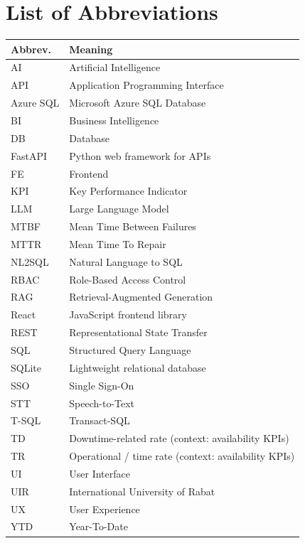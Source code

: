 \documentclass[12pt,a4paper,openany]{report}
\begin{document}
\chapter*{List of Abbreviations}
\begin{longtable}{@{}p{3.2cm}p{11cm}@{}}
\toprule
\textbf{Abbrev.} & \textbf{Meaning} \\
\midrule
\endhead
AI & Artificial Intelligence \\
API & Application Programming Interface \\
Azure SQL & Microsoft Azure SQL Database \\
BI & Business Intelligence \\
DB & Database \\
FastAPI & Python web framework for APIs \\
FE & Frontend \\
KPI & Key Performance Indicator \\
LLM & Large Language Model \\
MTBF & Mean Time Between Failures \\
MTTR & Mean Time To Repair \\
NL2SQL & Natural Language to SQL \\
RBAC & Role-Based Access Control \\
RAG & Retrieval-Augmented Generation \\
React & JavaScript frontend library \\
REST & Representational State Transfer \\
SQL & Structured Query Language \\
SQLite & Lightweight relational database \\
SSO & Single Sign-On \\
STT & Speech-to-Text \\
T-SQL & Transact-SQL \\
TD & Downtime-related rate (context: availability KPIs) \\
TR & Operational / time rate (context: availability KPIs) \\
UI & User Interface \\
UIR & International University of Rabat \\
UX & User Experience \\
YTD & Year-To-Date \\
\bottomrule
\end{longtable}

\tableofcontents
\listoffigures
\listoftables
\newpage
{}
\end{document}
